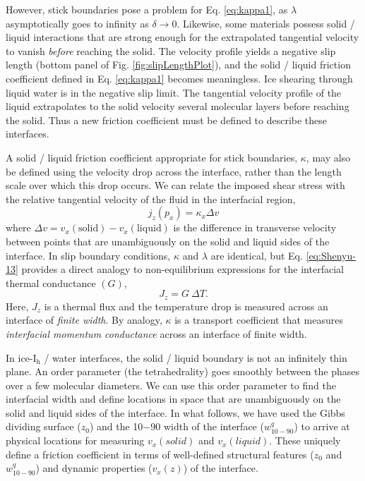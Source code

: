 However, stick boundaries pose a problem for Eq.  \eqref{eq:kappa1}, as
$\lambda$ asymptotically goes to infinity as $\delta \rightarrow 0$.
Likewise, some materials possess solid / liquid interactions that are
strong enough for the extrapolated tangential velocity to vanish
\textit{before} reaching the solid. The velocity profile yields a
negative slip length (bottom panel of Fig.  \ref{fig:slipLengthPlot}),
and the solid / liquid friction coefficient defined in
Eq. \eqref{eq:kappa1} becomes meaningless.  Ice shearing through liquid
water is in the negative slip limit. The tangential velocity profile
of the liquid extrapolates to the solid velocity several molecular
layers before reaching the solid. Thus a new friction coefficient must
be defined to describe these interfaces.

A solid / liquid friction coefficient appropriate for stick
boundaries, $\kappa$, may also be defined using the velocity drop
across the interface, rather than the length scale over which this
drop occurs. We can relate the imposed shear stress with the relative
tangential velocity of the fluid in the interfacial
region,\cite{Kuang2012}
\begin{equation}\label{eq:Shenyu-13}
j_{z}(p_{x}) = \kappa_{x} \Delta v
\end{equation}
where $\Delta v = v_{x}(\mathrm{solid}) - v_{x}(\mathrm{liquid})$ is
the difference in transverse velocity between points that are
unambiguously on the solid and liquid sides of the interface.  In slip
boundary conditions, $\kappa$ and $\lambda$ are identical, but
Eq. \eqref{eq:Shenyu-13} provides a direct analogy to non-equilibrium
expressions for the interfacial thermal conductance $(G)$,
\begin{equation}
J_z = G~ \Delta T.
\end{equation}
Here, $J_z$ is a thermal flux and the temperature drop is measured
across an interface of \textit{finite width}. By analogy, $\kappa$ is
a transport coefficient that measures \textit{interfacial momentum
  conductance} across an interface of finite width.

In ice-I$_\mathrm{h}$ / water interfaces, the solid / liquid boundary is not
an infinitely thin plane. An order parameter (the tetrahedrality) goes
smoothly between the phases over a few molecular diameters.  We can
use this order parameter to find the interfacial width and define
locations in space that are unambiguously on the solid and liquid
sides of the interface.  In what follows, we have used the Gibbs
dividing surface ($z_0$) and the 10$-$90 width of the interface
($w_\mathrm{10-90}^{q}$) to arrive at physical locations for measuring
$v_{x}(solid)$ and $v_{x}(liquid)$.  These uniquely define a friction
coefficient in terms of well-defined structural features ($z_0$ and
$w_\mathrm{10-90}^{q}$) and dynamic properties ($v_{x}(z)$) of the
interface.

